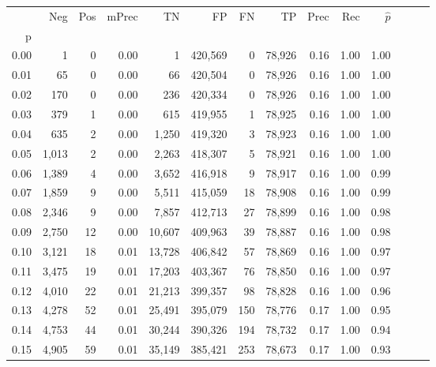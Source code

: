 \begin{tabular}{rrrrrrrrrrrrrr}
\toprule
{} &    Neg &    Pos & mPrec &       TN &       FP &      FN &      TP &  Prec &   Rec & $\hat{p}$ \\
p    &        &        &       &          &          &         &         &       &       &           \\
\midrule
0.00 &      1 &      0 &  0.00 &        1 &  420,569 &       0 &  78,926 &  0.16 &  1.00 &      1.00 \\
0.01 &     65 &      0 &  0.00 &       66 &  420,504 &       0 &  78,926 &  0.16 &  1.00 &      1.00 \\
0.02 &    170 &      0 &  0.00 &      236 &  420,334 &       0 &  78,926 &  0.16 &  1.00 &      1.00 \\
0.03 &    379 &      1 &  0.00 &      615 &  419,955 &       1 &  78,925 &  0.16 &  1.00 &      1.00 \\
0.04 &    635 &      2 &  0.00 &    1,250 &  419,320 &       3 &  78,923 &  0.16 &  1.00 &      1.00 \\
0.05 &  1,013 &      2 &  0.00 &    2,263 &  418,307 &       5 &  78,921 &  0.16 &  1.00 &      1.00 \\
0.06 &  1,389 &      4 &  0.00 &    3,652 &  416,918 &       9 &  78,917 &  0.16 &  1.00 &      0.99 \\
0.07 &  1,859 &      9 &  0.00 &    5,511 &  415,059 &      18 &  78,908 &  0.16 &  1.00 &      0.99 \\
0.08 &  2,346 &      9 &  0.00 &    7,857 &  412,713 &      27 &  78,899 &  0.16 &  1.00 &      0.98 \\
0.09 &  2,750 &     12 &  0.00 &   10,607 &  409,963 &      39 &  78,887 &  0.16 &  1.00 &      0.98 \\
0.10 &  3,121 &     18 &  0.01 &   13,728 &  406,842 &      57 &  78,869 &  0.16 &  1.00 &      0.97 \\
0.11 &  3,475 &     19 &  0.01 &   17,203 &  403,367 &      76 &  78,850 &  0.16 &  1.00 &      0.97 \\
0.12 &  4,010 &     22 &  0.01 &   21,213 &  399,357 &      98 &  78,828 &  0.16 &  1.00 &      0.96 \\
0.13 &  4,278 &     52 &  0.01 &   25,491 &  395,079 &     150 &  78,776 &  0.17 &  1.00 &      0.95 \\
0.14 &  4,753 &     44 &  0.01 &   30,244 &  390,326 &     194 &  78,732 &  0.17 &  1.00 &      0.94 \\
0.15 &  4,905 &     59 &  0.01 &   35,149 &  385,421 &     253 &  78,673 &  0.17 &  1.00 &      0.93 \\

\end{tabular}
